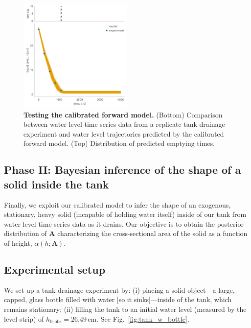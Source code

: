 \documentclass[openacc]{rsproca_new}%
\begin{document}
\begin{figure}[h!]
    \centering
    	\includegraphics[width=0.5\textwidth]{../test.pdf}
    \caption{
      \textbf{Testing the calibrated forward model.}
      (Bottom) Comparison between water level time series data from a replicate tank drainage experiment and water level trajectories predicted by the calibrated forward model. 
      (Top) Distribution of predicted emptying times.
      } \label{fig:test}
\end{figure}

\subsection{Phase II: Bayesian inference of the shape of a solid inside the tank} \label{sec:phaseII}
Finally, we exploit our calibrated model to infer the shape of an exogenous, stationary, heavy solid (incapable of holding water itself) inside of our tank from water level time series data as it drains.
Our objective is to obtain the posterior distribution of $\mathbf{A}$ characterizing the cross-sectional area of the solid as a function of height, $\alpha(h; \mathbf{A})$.

\subsection{Experimental setup}
We set up a tank drainage experiment by:
(i) placing a solid object---a large, capped, glass bottle filled with water [so it sinks]---inside of the tank, which remains stationary;
(ii) filling the tank to an initial water level (measured by the level strip) of $h_{0, \text{obs}}=26.49$\,cm. 
See Fig.~\ref{fig:tank_w_bottle}.
\end{document}
